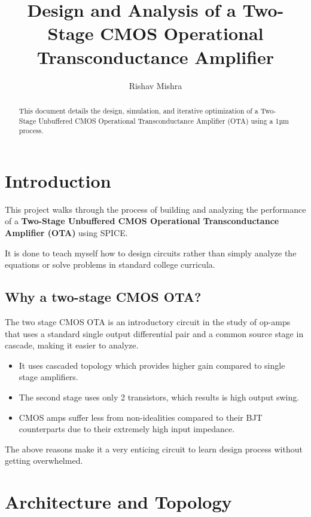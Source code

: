 \documentclass[
]{article}
\title{Design and Analysis of a Two-Stage CMOS Operational
Transconductance Amplifier}
\author{Rishav Mishra}
\date{}
\providecommand{\tightlist}{%
  \setlength{\itemsep}{0pt}\setlength{\parskip}{0pt}}
\begin{document}
\maketitle
\begin{abstract}
This document details the design, simulation, and iterative optimization
of a Two-Stage Unbuffered CMOS Operational Transconductance Amplifier
(OTA) using a 1µm process.
\end{abstract}


\section{Introduction}\label{introduction}

This project walks through the process of building and analyzing the
performance of a \textbf{Two-Stage Unbuffered CMOS Operational
Transconductance Amplifier (OTA)} using SPICE.

It is done to teach myself how to design circuits rather than simply
analyze the equations or solve problems in standard college curricula.

\subsection{Why a two-stage CMOS OTA?}\label{why-a-two-stage-cmos-ota}

The two stage CMOS OTA is an introductory circuit in the study of
op-amps that uses a standard single output differential pair and a
common source stage in cascade, making it easier to analyze.

\begin{itemize}
\tightlist
\item
  It uses cascaded topology which provides higher gain compared to
  single stage amplifiers.
\item
  The second stage uses only 2 transistors, which results is high output
  swing.
\item
  CMOS amps suffer less from non-idealities compared to their BJT
  counterparts due to their extremely high input impedance.
\end{itemize}

The above reasons make it a very enticing circuit to learn design
process without getting overwhelmed.

\section{Architecture and Topology}\label{architecture-and-topology}
\end{document}
